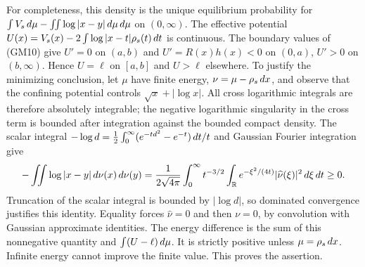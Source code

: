 For completeness, this density is the unique equilibrium probability
for $\int V_s\,d\mu-\iint\log|x-y|\,d\mu\,d\mu$ on $(0,\infty)$.
The effective potential
$U(x)=V_s(x)-2\int\log|x-t|\rho_s(t)\,d t$ is continuous.
The boundary values of (GM10) give $U'=0$ on $(a,b)$ and
$U'=R(x)h(x)<0$ on $(0,a)$, $U'>0$ on $(b,\infty)$.
Hence $U=\ell$ on $[a,b]$ and $U>\ell$ elsewhere.
To justify the minimizing conclusion, let $\mu$ have finite energy,
$\nu=\mu-\rho_s\,d x$, and observe that the confining potential
controls $\sqrt x+|\log x|$. All cross logarithmic integrals are therefore
absolutely integrable; the negative logarithmic singularity in the cross
term is bounded after integration against the bounded compact density.
The scalar integral
$-\log d=\tfrac12\int_0^\infty(e^{-td^2}-e^{-t})\,d t/t$
and Gaussian Fourier integration give
\[
 -\iint\log|x-y|\,d\nu(x)\,d\nu(y)
 =\frac1{2\sqrt{4\pi}}\int_0^\infty t^{-3/2}
       \int_\mathbb R e^{-\xi^2/(4t)}|\widehat\nu(\xi)|^2\,d\xi\,d t\ge0.
\]
Truncation of the scalar integral is bounded by $|\log d|$, so dominated
convergence justifies this identity. Equality forces $\widehat\nu=0$ and
then $\nu=0$, by convolution with Gaussian approximate identities.
The energy difference is the sum of this nonnegative quantity and
$\int(U-\ell)\,d\mu$. It is strictly positive unless $\mu=\rho_s\,d x$.
Infinite energy cannot improve the finite value. This proves the assertion.

